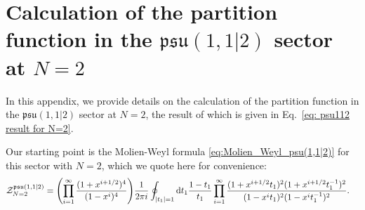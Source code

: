 \documentclass[a4paper,11pt]{article}
\begin{document}
\section{Calculation of the partition function in the \texorpdfstring{$\mathfrak{psu}(1,1|2)$}{psu(1,1|2)} sector at \texorpdfstring{$N=2$}{N=2}}
\label{app:psu(112)_N2}

In this appendix, we provide details on the calculation of the partition function in the $\mathfrak{psu}(1,1|2)$ sector at $N=2$, the result of which is given in Eq.\ \eqref{eq: psu112 result for N=2}.


Our starting point is the Molien-Weyl formula \eqref{eq:Molien_Weyl_psu(1,1|2)} for this sector with $N=2$, which we quote here for convenience: 
% 
\begin{equation} \label{eq:psu112_N=2}
\begin{split}
	\mathcal{Z}_{N=2}^{\mathfrak{psu}(1,1|2)} &= \qty(\prod_{i=1}^\infty\frac{(1+x^{i+1/2})^{4}}{(1-x^{i})^4}) 
	 \frac{1}{2\pi i}\oint_{|t_1|=1} \dd t_1 \frac{1-t_1}{t_1} \prod_{i=1}^\infty \frac{(1+x^{i+1/2}t_1)^2(1+x^{i+1/2}t_1^{-1})^2}{(1-x^{i}t_1)^2(1-x^{i}t_1^{-1})^2} .
\end{split}
\end{equation}
\end{document}
